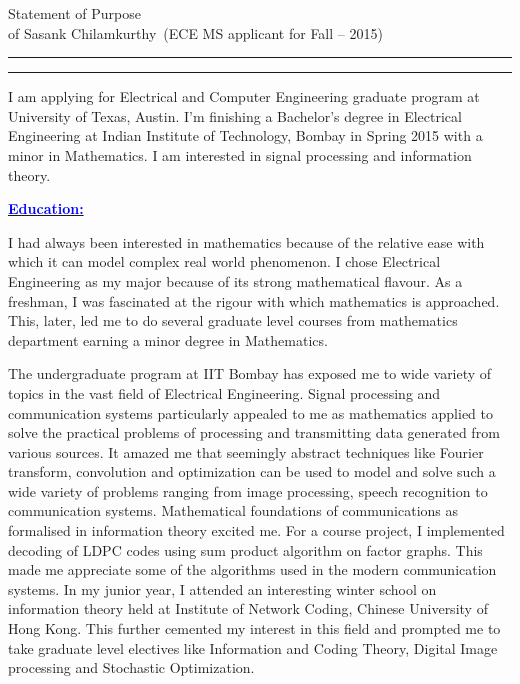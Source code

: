 \documentclass[11pt]{article}
\newcommand{\soptitle}{Statement of Purpose}
\newcommand{\yourname}{Sasank Chilamkurthy}
\newcommand{\statement}[1]{\par\medskip
  \underline{\textcolor{blue}{\textbf{#1:}}}\space
}
\begin{document}
\begin{center}
\LARGE\soptitle\\
\large of \yourname\ (ECE MS applicant for Fall -- 2015)
\end{center}

\hrule
\vspace{1pt}
\hrule height 1pt

\bigskip
I am applying for Electrical and Computer Engineering graduate program at University of Texas, Austin. 
I'm finishing a Bachelor's degree in Electrical Engineering at Indian Institute of Technology, Bombay in Spring 2015 with a minor in Mathematics. 
I am interested in signal processing and information theory.
\statement{Education}
I had always been interested in mathematics because of the relative ease with which it can model complex real world phenomenon. 
I chose Electrical Engineering as my major because of its strong mathematical flavour. 
As a freshman, I was fascinated at the rigour with which mathematics is approached. 
This, later, led me to do several graduate level courses from mathematics department earning a minor degree in Mathematics. 

The undergraduate program at IIT Bombay has exposed me to wide variety of topics in the vast field of Electrical Engineering. 
Signal processing and communication systems particularly appealed to me as mathematics applied to solve the practical problems of processing and transmitting data generated from various sources. 
It amazed me that seemingly abstract techniques like Fourier transform, convolution and optimization can be used to model and solve such a wide variety of problems ranging from image processing, speech recognition to communication systems.
Mathematical foundations of communications as formalised in information theory excited me. 
For a course project, I implemented decoding of LDPC codes using sum product algorithm on factor graphs. 
This made me appreciate some of the algorithms used in the modern communication systems. 
In my junior year, I attended an interesting winter school on information theory held at Institute of Network Coding, Chinese University of Hong Kong. 
This further cemented my interest in this field and prompted me to take graduate level electives like Information and Coding Theory, Digital Image processing and Stochastic Optimization.
\end{document}
